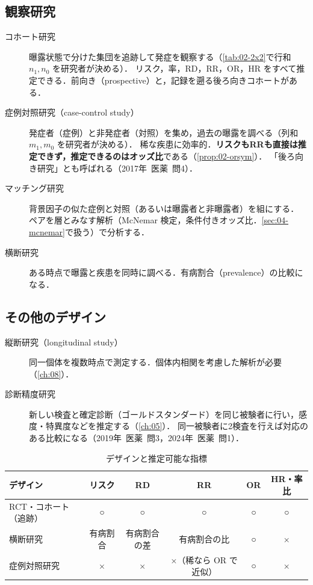 \documentclass[a4paper,11pt,openany]{ltjsbook}
\newcommand{\kakomon}[2]{\mbox{#1年 医薬 問#2}}
\begin{document}
\subsection{観察研究}\label{subsec:02-obs}
\begin{description}
\item[コホート研究] 曝露状態で分けた集団を追跡して発症を観察する（\cref{tab:02-2x2}で行和 $n_1,n_0$ を研究者が決める）．
      リスク，率，RD，RR，OR，HR をすべて推定できる．前向き（prospective）と，記録を遡る後ろ向きコホートがある．
\item[症例対照研究（case-control study）] 発症者（症例）と非発症者（対照）を集め，過去の曝露を調べる（列和 $m_1,m_0$ を研究者が決める）．
      稀な疾患に効率的．\textbf{リスクもRRも直接は推定できず，推定できるのはオッズ比}である（\cref{prop:02-orsym}）．
      「後ろ向き研究」とも呼ばれる（\kakomon{2017}{4}）．
\item[マッチング研究] 背景因子の似た症例と対照（あるいは曝露者と非曝露者）を組にする．
      ペアを層とみなす解析（McNemar 検定，条件付きオッズ比．\cref{sec:04-mcnemar}で扱う）で分析する．
\item[横断研究] ある時点で曝露と疾患を同時に調べる．有病割合（prevalence）の比較になる．
\end{description}

\subsection{その他のデザイン}
\begin{description}
\item[縦断研究（longitudinal study）] 同一個体を複数時点で測定する．個体内相関を考慮した解析が必要（\cref{ch:08}）．
\item[診断精度研究] 新しい検査と確定診断（ゴールドスタンダード）を同じ被験者に行い，感度・特異度などを推定する（\cref{ch:05}）．
      同一被験者に2検査を行えば対応のある比較になる（\kakomon{2019}{3}，\kakomon{2024}{1}）．
\end{description}

\begin{table}[htbp]
\centering\small
\caption{デザインと推定可能な指標}\label{tab:02-design}
\begin{tabular}{@{}lccccc@{}}
\toprule
デザイン & リスク & RD & RR & OR & HR・率比\\
\midrule
RCT・コホート（追跡） & ○ & ○ & ○ & ○ & ○\\
横断研究 & 有病割合 & 有病割合の差 & 有病割合の比 & ○ & ×\\
症例対照研究 & × & × & ×（稀なら OR で近似） & ○ & ×\\
\bottomrule
\end{tabular}
\end{table}
\end{document}

